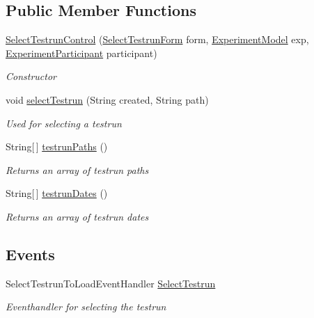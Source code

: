 \subsection*{Public Member Functions}
\begin{DoxyCompactItemize}
\item 
\hyperlink{class_web_analyzer_1_1_u_i_1_1_interaction_objects_1_1_select_testrun_control_a4f0dbab279a50962ffdcc3b473e6167e}{Select\+Testrun\+Control} (\hyperlink{class_web_analyzer_1_1_u_i_1_1_select_testrun_form}{Select\+Testrun\+Form} form, \hyperlink{class_web_analyzer_1_1_models_1_1_base_1_1_experiment_model}{Experiment\+Model} exp, \hyperlink{class_web_analyzer_1_1_models_1_1_base_1_1_experiment_participant}{Experiment\+Participant} participant)
\begin{DoxyCompactList}\small\item\em Constructor \end{DoxyCompactList}\item 
void \hyperlink{class_web_analyzer_1_1_u_i_1_1_interaction_objects_1_1_select_testrun_control_a72bf63ebb3acdce98d5403246ce1c24b}{select\+Testrun} (String created, String path)
\begin{DoxyCompactList}\small\item\em Used for selecting a testrun \end{DoxyCompactList}\item 
String\mbox{[}$\,$\mbox{]} \hyperlink{class_web_analyzer_1_1_u_i_1_1_interaction_objects_1_1_select_testrun_control_a57e1bd03061ac1ff242ceefd4833f604}{testrun\+Paths} ()
\begin{DoxyCompactList}\small\item\em Returns an array of testrun paths \end{DoxyCompactList}\item 
String\mbox{[}$\,$\mbox{]} \hyperlink{class_web_analyzer_1_1_u_i_1_1_interaction_objects_1_1_select_testrun_control_a56f1dc28ebb3c0894fd8407ccb27a40e}{testrun\+Dates} ()
\begin{DoxyCompactList}\small\item\em Returns an array of testrun dates \end{DoxyCompactList}\end{DoxyCompactItemize}
\subsection*{Events}
\begin{DoxyCompactItemize}
\item 
Select\+Testrun\+To\+Load\+Event\+Handler \hyperlink{class_web_analyzer_1_1_u_i_1_1_interaction_objects_1_1_select_testrun_control_add98c79fa38a7db09d583d84dbbce933}{Select\+Testrun}
\begin{DoxyCompactList}\small\item\em Eventhandler for selecting the testrun \end{DoxyCompactList}\end{DoxyCompactItemize}
